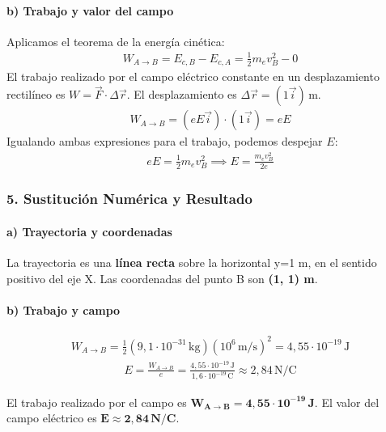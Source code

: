 \paragraph{b) Trabajo y valor del campo}
Aplicamos el teorema de la energía cinética:
\begin{gather}
    W_{A \to B} = E_{c,B} - E_{c,A} = \frac{1}{2}m_e v_B^2 - 0
\end{gather}
El trabajo realizado por el campo eléctrico constante en un desplazamiento rectilíneo es $W = \vec{F} \cdot \Delta\vec{r}$.
El desplazamiento es $\Delta\vec{r} = (1\vec{i})\,\text{m}$.
\begin{gather}
    W_{A \to B} = (eE\vec{i}) \cdot (1\vec{i}) = eE
\end{gather}
Igualando ambas expresiones para el trabajo, podemos despejar $E$:
\begin{gather}
    eE = \frac{1}{2}m_e v_B^2 \implies E = \frac{m_e v_B^2}{2e}
\end{gather}

\subsubsection*{5. Sustitución Numérica y Resultado}
\paragraph{a) Trayectoria y coordenadas}
\begin{cajaresultado}
La trayectoria es una \textbf{línea recta} sobre la horizontal y=1 m, en el sentido positivo del eje X. Las coordenadas del punto B son \textbf{(1, 1) m}.
\end{cajaresultado}

\paragraph{b) Trabajo y campo}
\begin{gather}
    W_{A \to B} = \frac{1}{2}(9,1\cdot10^{-31}\,\text{kg})(10^6\,\text{m/s})^2 = 4,55 \cdot 10^{-19}\,\text{J}
\end{gather}
\begin{gather}
    E = \frac{W_{A \to B}}{e} = \frac{4,55 \cdot 10^{-19}\,\text{J}}{1,6\cdot10^{-19}\,\text{C}} \approx 2,84\,\text{N/C}
\end{gather}
\begin{cajaresultado}
El trabajo realizado por el campo es $\boldsymbol{W_{A \to B} = 4,55 \cdot 10^{-19}\,\textbf{J}}$. El valor del campo eléctrico es $\boldsymbol{E \approx 2,84\,\textbf{N/C}}$.
\end{cajaresultado}

